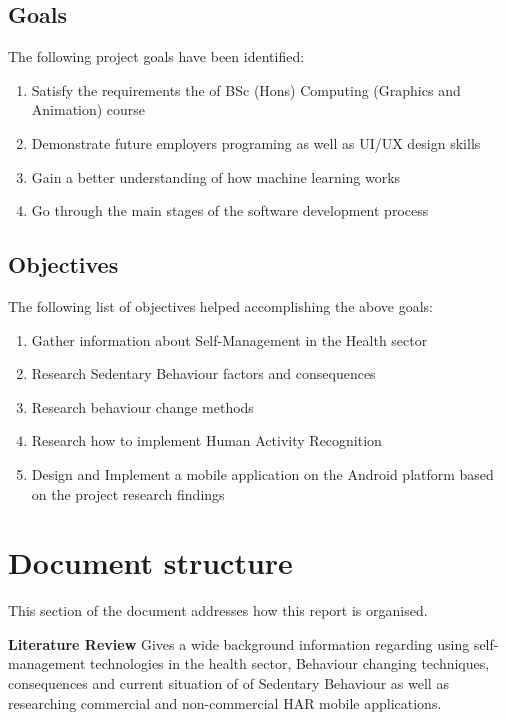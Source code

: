    \subsection*{Goals}
    The following project goals have been identified: 
    \begin{enumerate}
        \item Satisfy the requirements the of BSc (Hons) Computing (Graphics and Animation) course
        \item Demonstrate future employers programing as well as UI/UX design skills
        \item Gain a better understanding of how machine learning works 
        \item Go through the main stages of the software development process
    \end{enumerate}
    
    \subsection*{Objectives}
    The following list of objectives helped accomplishing the above goals: 
    \begin{enumerate}
        \item Gather information about Self-Management in the Health sector
        \item Research Sedentary Behaviour factors and consequences
        \item Research behaviour change methods
        \item Research how to implement Human Activity Recognition 
        \item Design and Implement a mobile application on the Android platform based on the project research findings
    \end{enumerate}
    
    \section{Document structure}
    This section of the document addresses how this report is organised.\newline
    
    \textbf{Literature Review} Gives a wide background information regarding using self-management technologies in the health sector, Behaviour changing techniques, consequences and current situation of of Sedentary Behaviour as well as researching commercial and non-commercial HAR mobile applications.\newline
    
